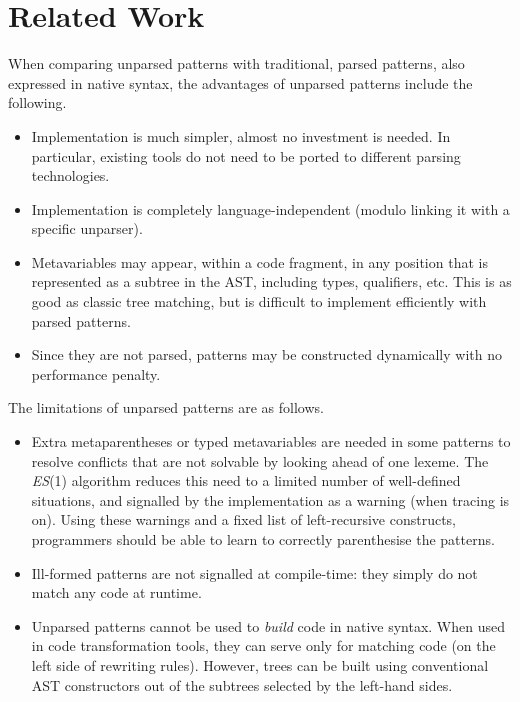 
\section{Related Work}
\label{related_work}

When comparing unparsed patterns with traditional, parsed patterns,
also expressed in native syntax, the advantages of unparsed patterns
include the following.
\begin{itemize}

  \item Implementation is much simpler, almost no investment is
    needed. In particular, existing tools do not need to be ported to
    different parsing technologies.

  \item Implementation is completely language\hyp{}independent (modulo
    linking it with a specific unparser).

  \item Meta\-variables may appear, within a code fragment, in any
    position that is represented as a subtree in the AST, including
    types, qualifiers, etc. This is as good as classic tree matching,
    but is difficult to implement efficiently with parsed patterns.

  \item Since they are not parsed, patterns may be constructed
    dynamically with no performance penalty.

\end{itemize}
The limitations of unparsed patterns are as follows.
\begin{itemize}

  \item Extra meta\-parentheses or typed meta\-variables are needed in
    some patterns to resolve conflicts that are not solvable by
    looking ahead of one lexeme. The \textit{ES}(1) algorithm reduces
    this need to a limited number of well\hyp{}defined situations, and
    signalled by the implementation as a warning (when tracing is
    on). Using these warnings and a fixed list of left\hyp{}recursive
    constructs, programmers should be able to learn to correctly
    parenthesise the patterns.

  \item Ill\hyp{}formed patterns are not signalled at
    compile\hyp{}time: they simply do not match any code at
    runtime.

  \item Unparsed patterns cannot be used to \emph{build} code in
    native syntax. When used in code transformation tools, they can
    serve only for matching code (on the left side of rewriting
    rules). However, trees can be built using conventional AST
    constructors out of the subtrees selected by the left\hyp{}hand
    sides. 

\end{itemize}
